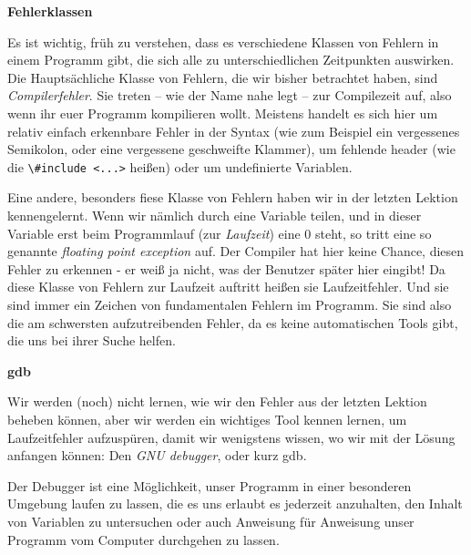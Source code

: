 
\textbf{Fehlerklassen}

Es ist wichtig, früh zu verstehen, dass es verschiedene Klassen von Fehlern in
einem \Cpp Programm gibt, die sich alle zu unterschiedlichen Zeitpunkten
auswirken. Die Hauptsächliche Klasse von Fehlern, die wir bisher betrachtet
haben, sind \emph{Compilerfehler}. Sie treten -- wie der Name nahe legt -- zur
Compilezeit auf, also wenn ihr euer Programm kompilieren wollt. Meistens
handelt es sich hier um relativ einfach erkennbare Fehler in der Syntax (wie
zum Beispiel ein vergessenes Semikolon, oder eine vergessene geschweifte
Klammer), um fehlende header (wie die \verb|\#include <...>| heißen) oder um
undefinierte Variablen.

Eine andere, besonders fiese Klasse von Fehlern haben wir in der letzten
Lektion kennengelernt. Wenn wir nämlich durch eine Variable teilen, und in
dieser Variable erst beim Programmlauf (zur \emph{Laufzeit}) eine 0 steht, so
tritt eine so genannte \emph{floating point exception} auf. Der Compiler hat
hier keine Chance, diesen Fehler zu erkennen - er weiß ja nicht, was der
Benutzer später hier eingibt! Da diese Klasse von Fehlern zur Laufzeit auftritt
heißen sie Laufzeitfehler. Und sie sind immer ein Zeichen von fundamentalen
Fehlern im Programm. Sie sind also die am schwersten aufzutreibenden Fehler, da
es keine automatischen Tools gibt, die uns bei ihrer Suche helfen.

\textbf{gdb}

Wir werden (noch) nicht lernen, wie wir den Fehler aus der letzten Lektion
beheben können, aber wir werden ein wichtiges Tool kennen lernen, um
Laufzeitfehler aufzuspüren, damit wir wenigstens wissen, wo wir mit der Lösung
anfangen können: Den \emph{GNU debugger}, oder kurz gdb.

Der Debugger ist eine Möglichkeit, unser Programm in einer besonderen Umgebung
laufen zu lassen, die es uns erlaubt es jederzeit anzuhalten, den Inhalt von
Variablen zu untersuchen oder auch Anweisung für Anweisung unser Programm vom
Computer durchgehen zu lassen.

